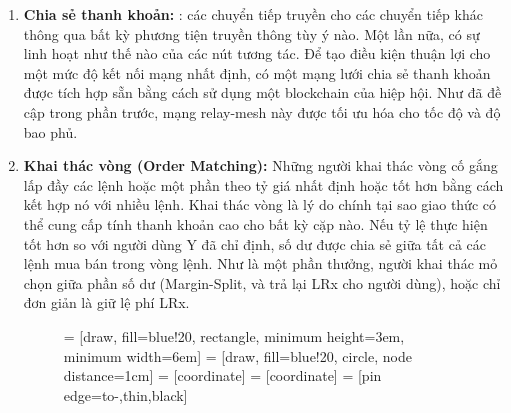 \documentclass[12pt,a4paper]{article}
\begin{document}
\begin{multicols}{2}
\begin{enumerate}[topsep=-5pt,itemsep=1ex,partopsep=5ex,parsep=1ex]
\item \textbf{Chia sẻ thanh khoản: }: các chuyển tiếp truyền cho các chuyển tiếp khác thông qua bất kỳ phương tiện truyền thông tùy ý nào. Một lần nữa, có sự linh hoạt như thế nào của các nút tương tác. Để tạo điều kiện thuận lợi cho một mức độ kết nối mạng nhất định, có một mạng lưới chia sẻ thanh khoản được tích hợp sẵn bằng cách sử dụng một blockchain của hiệp hội. Như đã đề cập trong phần trước, mạng relay-mesh này được tối ưu hóa cho tốc độ và độ bao phủ.

\item \textbf{Khai thác vòng (Order Matching):  }Những người khai thác vòng cố gắng lấp đầy các lệnh hoặc một phần theo tỷ giá nhất định hoặc tốt hơn bằng cách kết hợp nó với nhiều lệnh. Khai thác vòng là lý do chính tại sao giao thức có thể cung cấp tính thanh khoản cao cho bất kỳ cặp nào. Nếu tỷ lệ thực hiện tốt hơn so với người dùng Y đã chỉ định, số dư được chia sẻ giữa tất cả các lệnh mua bán trong vòng lệnh. Như là một phần thưởng, người khai thác mỏ chọn giữa phần số dư (Margin-Split, và trả lại LRx cho người dùng), hoặc chỉ đơn giản là giữ lệ phí LRx.
\begin{center}

\begin{figure}[H]
\centering
{} = [draw, fill=blue!20, rectangle,
    minimum height=3em, minimum width=6em]
 = [draw, fill=blue!20, circle, node distance=1cm]
 = [coordinate]
 = [coordinate]
 = [pin edge={to-,thin,black}]

\begin{tikzpicture}[
    auto,
    scale=0.7,
    node distance=2cm,
    >=latex',
    font=\bfseries\footnotesize\sffamily,
    order/.style={
    rectangle,
    scale=0.7,
    rounded corners,
    draw=black,
    text centered,
    minimum height=12mm,
    minimum width=30mm,
    fill=white
  },
  role/.style={
    circle,
    scale=0.7,
    draw=black,
    text centered,
    minimum height=12mm,
    minimum width=12mm,
    fill=white
  },
  steps/.style={
    circle,
    scale=0.7,
    draw=black,
    text centered,
    fill=black,
    text=white
  },
  account/.style={
    circle,
    scale=0.7,
    draw=black,
    text centered,
    minimum height=16mm,
    minimum width=16mm,
    fill=white
  },
  label/.style={
    scale=0.7
    }
  ]



\end{tikzpicture}
\end{figure}
\end{center}
\end{enumerate}
\end{multicols}
\end{document}
